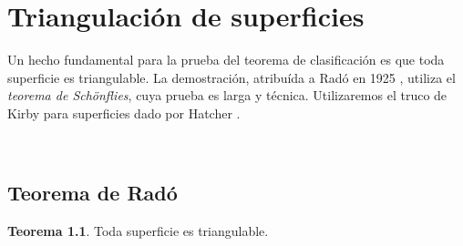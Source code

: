 \documentclass[10pt]{report}
\theoremstyle{definition}
\newtheorem{tma}[defin]{Teorema}
\begin{document}


\chapter{Triangulación de superficies}

Un hecho fundamental para la prueba del teorema de clasificación es que toda superficie es triangulable. La demostración, atribuída a Radó en 1925 \cite{rado}, utiliza el \emph{teorema de Schönflies}, cuya prueba es larga y técnica. Utilizaremos el truco de Kirby para superficies dado por Hatcher \cite{hatcher_torus}.

\

\section{Teorema de Radó}

\begin{tma}
Toda superficie es triangulable.
\end{tma}
\end{document}
